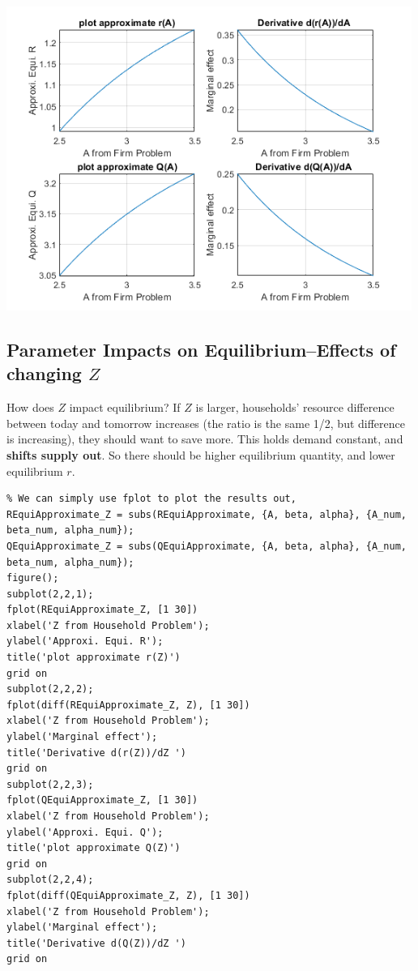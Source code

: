 \documentclass[
]{book}
\begin{document}
\includegraphics[width=5.20833in,height=\textheight]{img/demand_supply_taylor_approximate_capital_images/figure_1.png}

\hypertarget{parameter-impacts-on-equilibriumeffects-of-changing-z}{%
\subsection{\texorpdfstring{Parameter Impacts on Equilibrium--Effects of changing \(Z\)}{Parameter Impacts on Equilibrium--Effects of changing Z}}\label{parameter-impacts-on-equilibriumeffects-of-changing-z}}

How does \(Z\) impact equilibrium? If \(Z\) is larger, households' resource
difference between today and tomorrow increases (the ratio is the same
1/2, but difference is increasing), they should want to save more. This
holds demand constant, and \textbf{shifts supply out}. So there should be
higher equilibrium quantity, and lower equilibrium \(r\).

\begin{verbatim}
% We can simply use fplot to plot the results out, 
REquiApproximate_Z = subs(REquiApproximate, {A, beta, alpha}, {A_num, beta_num, alpha_num});
QEquiApproximate_Z = subs(QEquiApproximate, {A, beta, alpha}, {A_num, beta_num, alpha_num});
figure();
subplot(2,2,1);
fplot(REquiApproximate_Z, [1 30])
xlabel('Z from Household Problem');
ylabel('Approxi. Equi. R');
title('plot approximate r(Z)')
grid on
subplot(2,2,2);
fplot(diff(REquiApproximate_Z, Z), [1 30])
xlabel('Z from Household Problem');
ylabel('Marginal effect');
title('Derivative d(r(Z))/dZ ')
grid on
subplot(2,2,3);
fplot(QEquiApproximate_Z, [1 30])
xlabel('Z from Household Problem');
ylabel('Approxi. Equi. Q');
title('plot approximate Q(Z)')
grid on
subplot(2,2,4);
fplot(diff(QEquiApproximate_Z, Z), [1 30])
xlabel('Z from Household Problem');
ylabel('Marginal effect');
title('Derivative d(Q(Z))/dZ ')
grid on
\end{verbatim}
\end{document}

